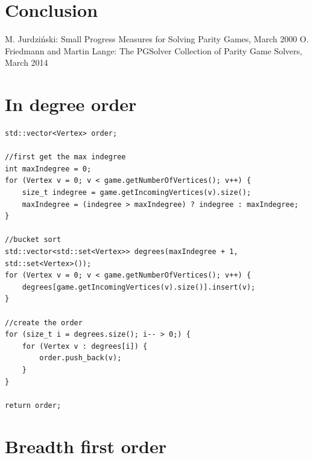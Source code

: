 \documentclass[10pt,a4paper]{article}
\begin{document}
\section{Conclusion}\label{conc}





\begin{thebibliography}{9}
 M. Jurdzi\'{n}ski: Small Progress Measures for Solving Parity Games, March 2000
 O. Friedmann and Martin Lange: The PGSolver Collection of Parity Game Solvers, March 2014
\end{thebibliography}


\newpage
\appendix

\section{In degree order}\label{appendix:indegree}
\begin{verbatim}
std::vector<Vertex> order;

//first get the max indegree
int maxIndegree = 0;
for (Vertex v = 0; v < game.getNumberOfVertices(); v++) {
	size_t indegree = game.getIncomingVertices(v).size();
	maxIndegree = (indegree > maxIndegree) ? indegree : maxIndegree;
}

//bucket sort
std::vector<std::set<Vertex>> degrees(maxIndegree + 1, std::set<Vertex>());
for (Vertex v = 0; v < game.getNumberOfVertices(); v++) {
	degrees[game.getIncomingVertices(v).size()].insert(v);
}

//create the order
for (size_t i = degrees.size(); i-- > 0;) {
	for (Vertex v : degrees[i]) {
		order.push_back(v);
	}
}

return order;
\end{verbatim}

\newpage
\section{Breadth first order}\label{appendix:bfs}
\end{document}
